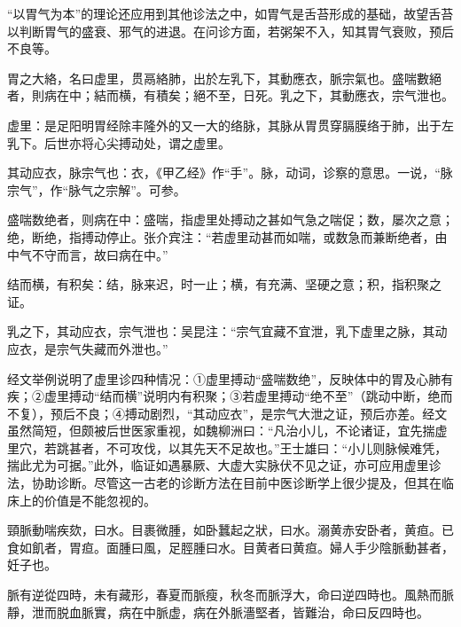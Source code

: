 \documentclass[12pt]{ctexbook}
\begin{document}
“以胃气为本”的理论还应用到其他诊法之中，如胃气是舌苔形成的基础，故望舌苔以判断胃气的盛衰、邪气的进退。在问诊方面，若粥架不入，知其胃气衰败，预后不良等。


\begin{yuanwen}
胃之大絡，名曰虚里，贯鬲絡肺，出於左乳下，其動應衣，脈宗氣也。盛喘數絕者，則病在中；結而横，有積矣；絕不至，日死。乳之下，其動應衣，宗气泄也。
\end{yuanwen}


\begin{jiaozhu}
  \item 虚里：是足阳明胃经除丰隆外的又一大的络脉，其脉从胃贯穿膈膜络于肺，出于左乳下。后世亦将心尖搏动处，谓之虚里。
  \item 其动应衣，脉宗气也：衣，《甲乙经》作“手”。脉，动词，诊察的意思。一说，“脉宗气”，作“脉气之宗解”。可参。
  \item 盛喘数绝者，则病在中：盛喘，指虚里处搏动之甚如气急之喘促；数，屡次之意；绝，断绝，指搏动停止。张介宾注：“若虚里动甚而如喘，或数急而兼断绝者，由中气不守而言，故曰病在中。”
  \item 结而横，有积矣：结，脉来迟，时一止；横，有充满、坚硬之意；积，指积聚之证。
  \item 乳之下，其动应衣，宗气泄也：吴昆注：“宗气宜藏不宜泄，乳下虚里之脉，其动应衣，是宗气失藏而外泄也。”
\end{jiaozhu}



经文举例说明了虚里诊四种情况：①虚里搏动“盛喘数绝”，反映体中的胃及心肺有疾；②虚里搏动“结而横”说明内有积聚；③若虚里搏动“绝不至”（跳动中断，绝而不复），预后不良；④搏动剧烈，“其动应衣”，是宗气大泄之证，预后亦差。经文虽然简短，但颇被后世医家重视，如魏柳洲曰：“凡治小儿，不论诸证，宜先揣虚里穴，若跳甚者，不可攻伐，以其先天不足故也。”王士雄曰：“小儿则脉候难凭，揣此尤为可据。”此外，临证如遇暴厥、大虚大实脉伏不见之证，亦可应用虚里诊法，协助诊断。尽管这一古老的诊断方法在目前中医诊断学上很少提及，但其在临床上的价值是不能忽视的。


\begin{yuanwen}
頸脈動喘疾欬，曰水。目裹微腫，如卧蠶起之狀，曰水。溺黄赤安卧者，黄疸。已食如飢者，胃疸。面腫曰風，足脛腫曰水。目黄者曰黄疸。婦人手少陰脈動甚者，妊子也。

脈有逆從四時，未有藏形，春夏而脈瘦，秋冬而脈浮大，命曰逆四時也。風熱而脈靜，泄而脱血脈實，病在中脈虚，病在外脈濇堅者，皆難治，命曰反四時也。
\end{yuanwen}
\end{document}
